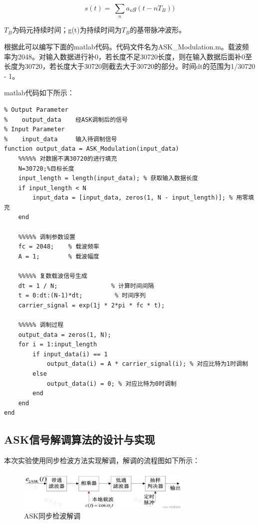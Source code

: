 \documentclass[UTF8]{ctexart}
\begin{document}
$$s\left(t\right)=\ \sum_{n}{a_n g(t-n T_B))}$$

$T_B$为码元持续时间；g(t)为持续时间为$T_B$的基带脉冲波形。

根据此可以编写下面的matlab代码。代码文件名为ASK\_Modulation.m。载波频率为2048。对输入数据进行补0，若长度不足30720长度，则在输入数据后面补0至长度为30720，若长度大于30720则截去大于30720的部分。时间dt的范围为1/30720 - 1。

matlab代码如下所示：

\begin{lstlisting}[title=ASK\_Modulation.m, frame=shadowbox]
% Parameter List:       
% Output Parameter
%    output_data    经ASK调制后的信号
% Input Parameter
%    input_data	    输入待调制信号
function output_data = ASK_Modulation(input_data)
    %%%%% 对数据不满30720的进行填充
    N=30720;%目标长度
    input_length = length(input_data); % 获取输入数据长度
    if input_length < N
        input_data = [input_data, zeros(1, N - input_length)]; % 用零填充
    end
    
    %%%%% 调制参数设置
    fc = 2048;    % 载波频率
    A = 1;        % 载波幅度
    
    %%%%% 复数载波信号生成
    dt = 1 / N;               % 计算时间间隔
    t = 0:dt:(N-1)*dt;         % 时间序列
    carrier_signal = exp(1j * 2*pi * fc * t); 
    
    %%%%% 调制过程
    output_data = zeros(1, N); 
    for i = 1:input_length
        if input_data(i) == 1
            output_data(i) = A * carrier_signal(i); % 对应比特为1时调制
        else
            output_data(i) = 0; % 对应比特为0时调制
        end
    end
end
\end{lstlisting}

\subsection{ASK信号解调算法的设计与实现}
\label{para.3.2}

本次实验使用同步检波方法实现解调，解调的流程图如下所示：

\begin{figure}[H]
    \centering
    
    \includegraphics[width=0.75\textwidth]{pics/1.png}
    \caption{ASK同步检波解调}\label{fig:1}

\end{figure}
\end{document}
